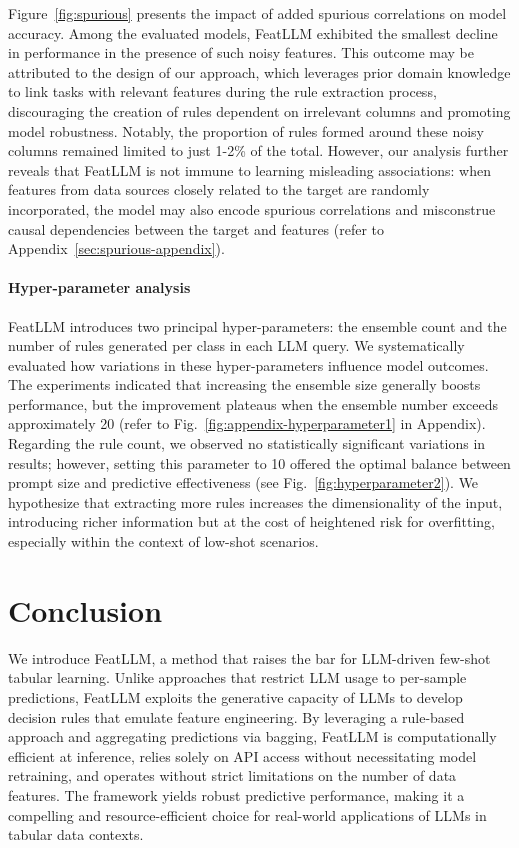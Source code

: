 Figure~\ref{fig:spurious} presents the impact of added spurious correlations on model accuracy. Among the evaluated models, \textsf{FeatLLM} exhibited the smallest decline in performance in the presence of such noisy features. This outcome may be attributed to the design of our approach, which leverages prior domain knowledge to link tasks with relevant features during the rule extraction process, discouraging the creation of rules dependent on irrelevant columns and promoting model robustness. Notably, the proportion of rules formed around these noisy columns remained limited to just 1-2\% of the total. However, our analysis further reveals that \textsf{FeatLLM} is not immune to learning misleading associations: when features from data sources closely related to the target are randomly incorporated, the model may also encode spurious correlations and misconstrue causal dependencies between the target and features (refer to Appendix~\ref{sec:spurious-appendix}).

\vspace*{-0.12in}
\paragraph{Hyper-parameter analysis}
\textsf{FeatLLM} introduces two principal hyper-parameters: the ensemble count and the number of rules generated per class in each LLM query. We systematically evaluated how variations in these hyper-parameters influence model outcomes. The experiments indicated that increasing the ensemble size generally boosts performance, but the improvement plateaus when the ensemble number exceeds approximately 20 (refer to Fig.~\ref{fig:appendix-hyperparameter1} in Appendix). Regarding the rule count, we observed no statistically significant variations in results; however, setting this parameter to 10 offered the optimal balance between prompt size and predictive effectiveness (see Fig.~\ref{fig:hyperparameter2}). We hypothesize that extracting more rules increases the dimensionality of the input, introducing richer information but at the cost of heightened risk for overfitting, especially within the context of low-shot scenarios.

\section{Conclusion}
We introduce \textsf{FeatLLM}, a method that raises the bar for LLM-driven few-shot tabular learning. Unlike approaches that restrict LLM usage to per-sample predictions, \textsf{FeatLLM} exploits the generative capacity of LLMs to develop decision rules that emulate feature engineering. By leveraging a rule-based approach and aggregating predictions via bagging, \textsf{FeatLLM} is computationally efficient at inference, relies solely on API access without necessitating model retraining, and operates without strict limitations on the number of data features. The framework yields robust predictive performance, making it a compelling and resource-efficient choice for real-world applications of LLMs in tabular data contexts.

